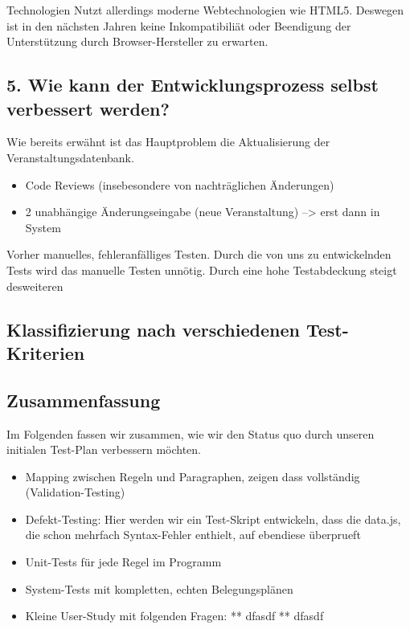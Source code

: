 \documentclass[ngerman]{article}
\begin{document}
Technologien Nutzt allerdings moderne Webtechnologien wie HTML5.
Deswegen ist in den nächsten Jahren keine Inkompatibiliät oder
Beendigung der Unterstützung durch Browser-Hersteller zu erwarten.

\subsection{5. Wie kann der Entwicklungsprozess selbst verbessert
werden?}\label{wie-kann-der-entwicklungsprozess-selbst-verbessert-werden}

Wie bereits erwähnt ist das Hauptproblem die Aktualisierung der
Veranstaltungsdatenbank.

\begin{itemize}
\itemsep1pt\parskip0pt
\item
  Code Reviews (insebesondere von nachträglichen Änderungen)
\item
  2 unabhängige Änderungseingabe (neue Veranstaltung) --\textgreater{}
  erst dann in System
\end{itemize}

Vorher manuelles, fehleranfälliges Testen. Durch die von uns zu
entwickelnden Tests wird das manuelle Testen unnötig. Durch eine hohe
Testabdeckung steigt desweiteren

\subsection{Klassifizierung nach verschiedenen
Test-Kriterien}\label{klassifizierung-nach-verschiedenen-test-kriterien}

\subsection{Zusammenfassung}\label{zusammenfassung}

Im Folgenden fassen wir zusammen, wie wir den Status quo durch unseren
initialen Test-Plan verbessern möchten.

\begin{itemize}
\itemsep1pt\parskip0pt
\item
  Mapping zwischen Regeln und Paragraphen, zeigen dass vollständig
  (Validation-Testing)
\item
  Defekt-Testing: Hier werden wir ein Test-Skript entwickeln, dass die
  data.js, die schon mehrfach Syntax-Fehler enthielt, auf ebendiese
  überprueft
\item
  Unit-Tests für jede Regel im Programm
\item
  System-Tests mit kompletten, echten Belegungsplänen
\item
  Kleine User-Study mit folgenden Fragen: ** dfasdf ** dfasdf
\end{itemize}
\end{document}
